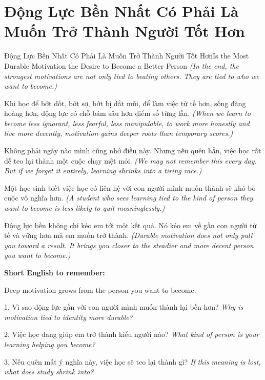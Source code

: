 \section{Động Lực Bền Nhất Có Phải Là Muốn Trở Thành Người Tốt Hơn}
\begin{truyen}{Động Lực Bền Nhất Có Phải Là Muốn Trở Thành Người Tốt Hơn}{Is the Most Durable Motivation the Desire to Become a Better Person}
\textit{(In the end, the strongest motivations are not only tied to beating others. They are tied to who we want to become.)}

Khi học để bớt dốt, bớt sợ, bớt bị dắt mũi, để làm việc tử tế hơn, sống đàng hoàng hơn, động lực có chỗ bám sâu hơn điểm số từng lần.
\textit{(When we learn to become less ignorant, less fearful, less manipulable, to work more honestly and live more decently, motivation gains deeper roots than temporary scores.)}

Không phải ngày nào mình cũng nhớ điều này. Nhưng nếu quên hẳn, việc học rất dễ teo lại thành một cuộc chạy mệt mỏi.
\textit{(We may not remember this every day. But if we forget it entirely, learning shrinks into a tiring race.)}

Một học sinh biết việc học có liên hệ với con người mình muốn thành sẽ khó bỏ cuộc vô nghĩa hơn.
\textit{(A student who sees learning tied to the kind of person they want to become is less likely to quit meaninglessly.)}
\end{truyen}

\begin{baihoc}
Động lực bền không chỉ kéo em tới một kết quả. Nó kéo em về gần con người tử tế và vững hơn mà em muốn trở thành.
\textit{(Durable motivation does not only pull you toward a result. It brings you closer to the steadier and more decent person you want to become.)}
\end{baihoc}

\begin{ghinhoanh}
\textbf{Short English to remember:}

Deep motivation grows from the person you want to become.

\end{ghinhoanh}

\begin{tuhocnhanh}
1. Vì sao động lực gắn với con người mình muốn thành lại bền hơn? \textit{Why is motivation tied to identity more durable?}

2. Việc học đang giúp em trở thành kiểu người nào? \textit{What kind of person is your learning helping you become?}

3. Nếu quên mất ý nghĩa này, việc học sẽ teo lại thành gì? \textit{If this meaning is lost, what does study shrink into?}
\end{tuhocnhanh}
\ngancach

